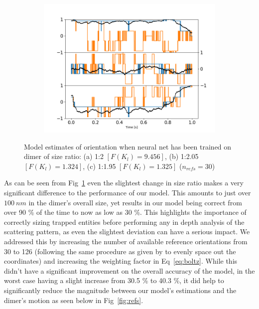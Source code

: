 \documentclass[preprint,  3p]{elsarticle}
\begin{document}
\begin{figure}[h]
\begin{subfigure}{0.31\textwidth}
		\includegraphics[width=\textwidth]{./Images/fig8c.png}
	\end{subfigure}
	\caption{Model estimates of orientation when neural net has been trained on dimer of size ratio: (a) 1:2 $[F(K_l)=9.456]$, (b) 1:2.05 $[F(K_l)=1.324]$, (c) 1:1.95 $[F(K_l)=1.325]$ ($n_{refs} = 30$)}
	\label{fig:size}
\end{figure}
As can be seen from Fig~\ref{fig:size}  even the slightest change in size ratio makes a very significant difference to the performance of our model. This amounts to just over $100 \ nm$ in the dimer's overall size, yet results in our model being correct from over 90 \% of the time to now as low as 30 \%. This highlights the importance of correctly sizing trapped entities before performing any in depth analysis of the scattering pattern, as even the slightest deviation can have a serious impact. We addressed this by increasing the number of available reference orientations from 30 to 126 (following the same procedure as given by \cite{Rey2006} to evenly space out the coordinates) and increasing the weighting factor in Eq~\ref{eq:boltz}. While this didn't have a significant improvement on the overall accuracy of the model, in the worst case having a slight increase from 30.5 \% to 40.3 \%, it did help to significantly reduce the magnitude between our model's estimations and the dimer's motion as seen below in Fig~\ref{fig:refs}.
\end{document}
